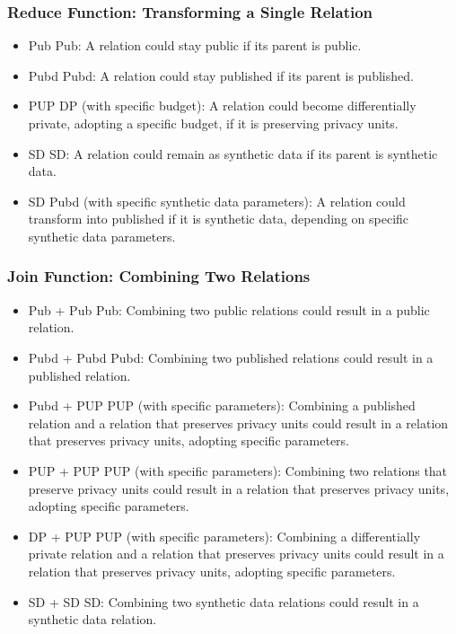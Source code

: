 \documentclass[letterpaper]{article} %
\begin{document}
\subsubsection*{Reduce Function: Transforming a Single Relation}
\begin{itemize}
    \item Pub \textrightarrow{} Pub: A relation could stay public if its parent is public.
    \item Pubd \textrightarrow{} Pubd: A relation could stay published if its parent is published.
    \item PUP \textrightarrow{} DP (with specific budget): A relation could become differentially private, adopting a specific budget, if it is preserving privacy units.
    \item SD \textrightarrow{} SD: A relation could remain as synthetic data if its parent is synthetic data.
    \item SD \textrightarrow{} Pubd (with specific synthetic data parameters): A relation could transform into published if it is synthetic data, depending on specific synthetic data parameters.
\end{itemize}

\subsubsection*{Join Function: Combining Two Relations}
\begin{itemize}
    \item Pub + Pub \textrightarrow{} Pub: Combining two public relations could result in a public relation.
    \item Pubd + Pubd \textrightarrow{} Pubd: Combining two published relations could result in a published relation.
    \item Pubd + PUP \textrightarrow{} PUP (with specific parameters): Combining a published relation and a relation that preserves privacy units could result in a relation that preserves privacy units, adopting specific parameters.
    \item PUP + PUP \textrightarrow{} PUP (with specific parameters): Combining two relations that preserve privacy units could result in a relation that preserves privacy units, adopting specific parameters.
    \item DP + PUP \textrightarrow{} PUP (with specific parameters): Combining a differentially private relation and a relation that preserves privacy units could result in a relation that preserves privacy units, adopting specific parameters.
    \item SD + SD \textrightarrow{} SD: Combining two synthetic data relations could result in a synthetic data relation.
\end{itemize}
\end{document}
